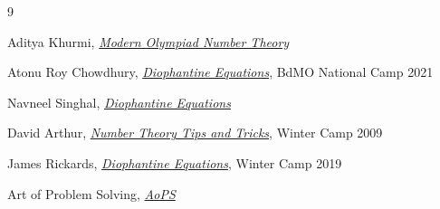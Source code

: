 \documentclass[11pt]{report}
\begin{document}
\begin{thebibliography}{9}

 Aditya Khurmi, \emph{\href{https://drive.google.com/file/d/1BcJTLjQaelZ4w_70oHKyImC2I8zLfyrt/view}{Modern Olympiad Number Theory}}

 Atonu Roy Chowdhury, \emph{\href{https://atonurc.github.io/assets/dioph.pdf}{Diophantine Equations}}, BdMO National Camp 2021

 Navneel Singhal, \emph{\href{https://ghoshadi.files.wordpress.com/2020/05/diophantine-equations-note-1.pdf}{Diophantine Equations}}

 David Arthur, \emph{\href{https://drive.google.com/file/d/18l41QOLZ3M93z3lD7FKyE_CsXGsNbIvP/view}{Number Theory Tips and Tricks}}, Winter Camp 2009

 James Rickards, \emph{\href{https://drive.google.com/file/d/1K2RVdWEfb_NJ5b7shZsNExH2rJLEx1RH/view}{Diophantine Equations}}, Winter Camp 2019

 Art of Problem Solving, \emph{\href{https://artofproblemsolving.com/}{AoPS}}

\end{thebibliography}
\end{document}
